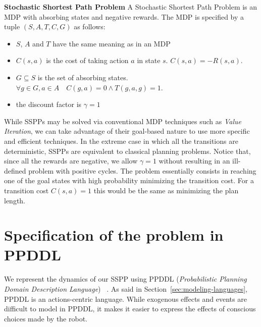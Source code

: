 \documentclass[../root.tex]{subfiles}
\begin{document}
\theoremstyle{definition}
\begin{definition}{\bfseries Stochastic Shortest Path Problem}
	A Stochastic Shortest Path Problem is an MDP with absorbing states and
	negative rewards. The MDP is specified by a tuple $ (S, A, T, C, G) $ as
	follows:
	\begin{itemize}
		\item $ S $, $ A $ and $ T $  have the same meaning as in an MDP
		\item $ C(s, a) $ is the cost of taking action $ a $ in state $ s $.
		$ C(s, a) = -R(s, a) $.
		\item $ G \subseteq S $ is the set of absorbing states.
		$ \forall g \in G, a \in A \quad C(g, a) = 0 \land T(g,a,g) = 1 $.
		\item the discount factor is $ \gamma = 1 $
	\end{itemize}
\end{definition}

While SSPPs may be solved via conventional MDP techniques such as
\emph{Value Iteration}, we can take advantage of their goal-based nature
to use more specific and efficient techniques. In the extreme case in which
all the transitions are deterministic, SSPPs are equivalent to classical
planning problems. Notice that, since all the rewards are negative, we allow
$ \gamma = 1 $ without resulting in an ill-defined problem with positive
cycles. The problem essentially consists in reaching one of the goal
states with high probability minimizing the transition cost. For a transition
cost $ C(s, a) = 1 $ this would be the same as minimizing the plan length.

\section{Specification of the problem in PPDDL}

We represent the dynamics of our SSPP using PPDDL
(\emph{Probabilistic Planning Domain Description Language})%
~\cite{younes2004ppddl1}. As said in
Section~\ref{sec:modeling-languages}, PPDDL is an actions-centric language.
While exogenous effects and events are difficult to model in PPDDL, it makes
it easier to express the effects of conscious choices made by the
robot.
\end{document}
